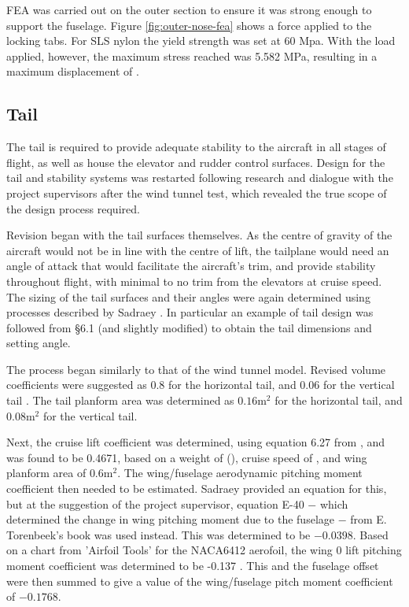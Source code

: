 \documentclass[../../main.tex]{subfiles}
\begin{document}

FEA was carried out on the outer section to ensure it was strong enough to support the fuselage.
Figure \ref{fig:outer-nose-fea} shows a  force applied to the locking tabs.
For SLS nylon the yield strength was set at 60 Mpa.
With the  load applied, however, the maximum stress reached was 5.582 MPa, resulting in a maximum displacement of . 

\subsection{Tail} \label{sec:design-process:revised-design:tail}

The tail is required to provide adequate stability to the aircraft in all stages of flight, as well as house the elevator and rudder control surfaces.
Design for the tail and stability systems was restarted following research and dialogue with the project supervisors after the wind tunnel test, which revealed the true scope of the design process required. 

Revision began with the tail surfaces themselves.
As the centre of gravity of the aircraft would not be in line with the centre of lift, the tailplane would need an angle of attack that would facilitate the aircraft's trim, and provide stability throughout flight, with minimal to no trim from the elevators at cruise speed.
The sizing of the tail surfaces and their angles were again determined using processes described by Sadraey \cite{sadraey-13}.
In particular an example of tail design was followed from \S 6.1 (and slightly modified) to obtain the tail dimensions and setting angle. 

The process began similarly to that of the wind tunnel model.
Revised volume coefficients were suggested as 0.8 for the horizontal tail, and 0.06 for the vertical tail \cite{towell-19}.
The tail planform area was determined as $0.16 \mathrm{m^2}$ for the horizontal tail, and $0.08 \mathrm{m^2}$ for the vertical tail.  %

Next, the cruise lift coefficient was determined, using equation 6.27 from \cite{sadraey-13}, and was found to be 0.4671, based on a weight of  (), cruise speed of , and wing planform area of $0.6 \mathrm{m^2}$.
The wing/fuselage aerodynamic pitching moment coefficient then needed to be estimated.
Sadraey provided an equation for this, but at the suggestion of the project supervisor, equation E-40 $-$ which determined the change in wing pitching moment due to the fuselage $-$ from E. Torenbeek’s book \cite{torenbeek-76} was used instead.
This was determined to be $-0.0398$.
Based on a chart from 'Airfoil Tools' for the NACA6412 aerofoil, the wing 0 lift pitching moment coefficient was determined to be -0.137 \cite{airfoil-tools-19}.
This and the fuselage offset were then summed to give a value of the wing/fuselage pitch moment coefficient of $-0.1768.$ 
\end{document}
